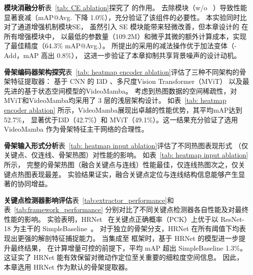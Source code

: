 \textbf{\channelblockshort 模块消融分析}\quad 表~\ref{tab: CE ablation}探究了 \channelblockshort 的作用。
去除\channelblockshort 模块（w/o ~\channelblockshort）导致性能显著衰减（mAP@Avg. 下降 1.0\%），充分验证了该组件的必要性。
本实验同时比对了通道增强机制模块SE\cite{hu2018squeeze}，
虽然引入 SE 模块能带来轻微改善，但本章设计的 \channelblockshort 在所有增强模块中，
以最低的参数量（109.2M）和微乎其微的额外计算成本，实现了最佳精度（64.3\% mAP@Avg.）。
所提出的\channelblockshort 采用的减法操作优于加法变体（\channelblockshort-Add，mAP 高出 0.8\%），
这进一步验证了本章抑制共享背景噪声的设计动机。

\textbf{骨架编码器架构探究}\quad 表~\ref{tab: heatmap encoder ablation}评估了三种不同架构的骨架特征提取器：
基于 CNN 的 I3D \cite{carreira2017quo}、多尺度Vision Transformer（MViT）\cite{fan2021multiscale}
以及最先进的基于状态空间模型的VideoMamba\cite{li2025videomamba}。
考虑到热图数据的空间稀疏性，对MViT和VideoMamba均采用了 3 层的浅层架构设计。
如表~\ref{tab: heatmap encoder ablation} 所示，VideoMamba展现出卓越的性能优势，其平均mAP达到 52.7\%，
显著优于I3D（42.7\%）和 MViT（49.1\%）。这一结果充分验证了选用 VideoMamba 作为骨架特征主干网络的合理性。

\textbf{骨架输入形式分析}\quad 表~\ref{tab: heatmap input ablation}评估了不同热图表现形式
（仅关键点、仅连线、骨架热图）对性能的影响。
如表~\ref{tab: heatmap input ablation} 所示，
完整的骨架热图（融合关键点与连线）性能最佳，仅连线热图次之，仅关键点热图表现最差。
实验结果证实，融合关键点定位与连线结构信息能够产生显著的协同增益。

\textbf{关键点检测器影响评估}\quad 表~\ref{tab:extractor_performance}和表~\ref{tab:framework_performance}
分别对比了不同关键点检测器各自性能及对最终性能的影响。
实验表明，HRNet~\cite{wang2020deep} 在关键点正确概率（PCK）上优于以 
ResNet-18 \cite{he2016deep} 为主干的 SimpleBaseline~\cite{xiao2018simple}。
对于独立的骨架分支，HRNet 在所有阈值下均表现出更强的解剖特征捕捉能力。
当集成至 \sexyname 框架时，基于 HRNet 的模型进一步提升最终结果，
在计算增量可控的前提下，平均 mAP 超出 SimpleBaseline 1.3\%。
这证实了 HRNet 能有效保留对微动作定位至关重要的细粒度空间信息。
因此，本章选用 HRNet 作为默认的骨架提取器。


